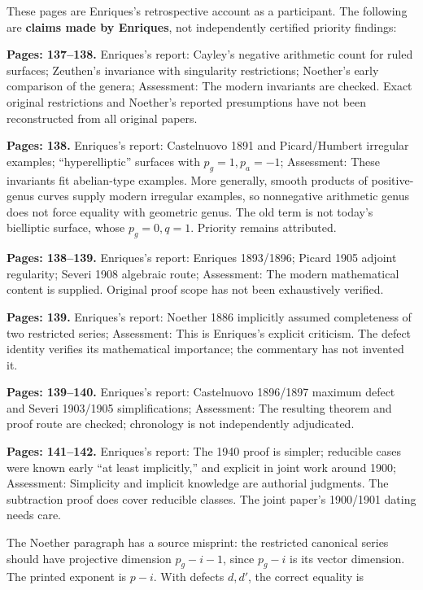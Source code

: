 These pages are Enriques's retrospective account as a participant. The following are \textbf{claims made by Enriques}, not independently certified priority findings:

\textbf{Pages: 137--138.} Enriques's report: Cayley's negative arithmetic count for ruled surfaces; Zeuthen's invariance with singularity restrictions; Noether's early comparison of the genera; Assessment: The modern invariants are checked. Exact original restrictions and Noether's reported presumptions have not been reconstructed from all original papers.

\textbf{Pages: 138.} Enriques's report: Castelnuovo 1891 and Picard/Humbert irregular examples; ``hyperelliptic'' surfaces with \(p_g=1,p_a=-1\); Assessment: These invariants fit abelian-type examples. More generally, smooth products of positive-genus curves supply modern irregular examples, so nonnegative arithmetic genus does not force equality with geometric genus. The old term is not today's bielliptic surface, whose \(p_g=0,q=1\). Priority remains attributed.

\textbf{Pages: 138--139.} Enriques's report: Enriques 1893/1896; Picard 1905 adjoint regularity; Severi 1908 algebraic route; Assessment: The modern mathematical content is supplied. Original proof scope has not been exhaustively verified.

\textbf{Pages: 139.} Enriques's report: Noether 1886 implicitly assumed completeness of two restricted series; Assessment: This is Enriques's explicit criticism. The defect identity verifies its mathematical importance; the commentary has not invented it.

\textbf{Pages: 139--140.} Enriques's report: Castelnuovo 1896/1897 maximum defect and Severi 1903/1905 simplifications; Assessment: The resulting theorem and proof route are checked; chronology is not independently adjudicated.

\textbf{Pages: 141--142.} Enriques's report: The 1940 proof is simpler; reducible cases were known early ``at least implicitly,'' and explicit in joint work around 1900; Assessment: Simplicity and implicit knowledge are authorial judgments. The subtraction proof does cover reducible classes. The joint paper's 1900/1901 dating needs care.

The Noether paragraph has a source misprint: the restricted canonical series should have projective dimension \(p_g-i-1\), since \(p_g-i\) is its vector dimension. The printed exponent is \(p-i\). With defects \(d,d'\), the correct equality is

